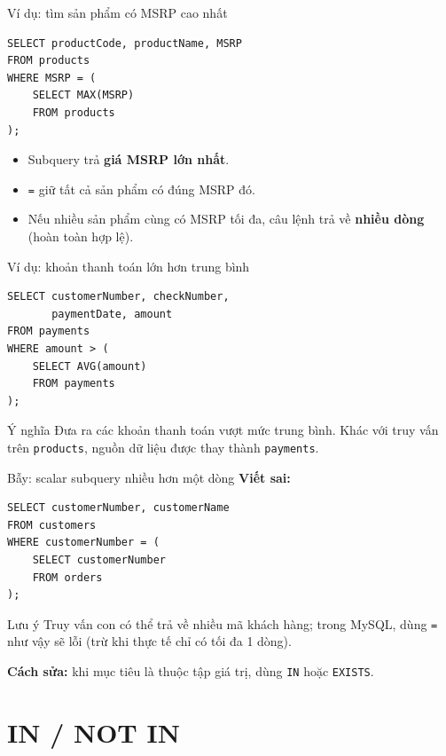 \documentclass[aspectratio=169,10pt]{beamer}
\newcommand{\code}[1]{\texttt{#1}}
\begin{document}
\begin{frame}[fragile]{Ví dụ: tìm sản phẩm có MSRP cao nhất}
\begin{lstlisting}
SELECT productCode, productName, MSRP
FROM products
WHERE MSRP = (
    SELECT MAX(MSRP)
    FROM products
);
\end{lstlisting}
\begin{itemize}
\item Subquery trả \textbf{giá MSRP lớn nhất}.
\item \code{=} giữ tất cả sản phẩm có đúng MSRP đó.
\item Nếu nhiều sản phẩm cùng có MSRP tối đa, câu lệnh trả về \textbf{nhiều dòng} (hoàn toàn hợp lệ).
\end{itemize}
\end{frame}

\begin{frame}[fragile]{Ví dụ: khoản thanh toán lớn hơn trung bình}
\begin{lstlisting}
SELECT customerNumber, checkNumber,
       paymentDate, amount
FROM payments
WHERE amount > (
    SELECT AVG(amount)
    FROM payments
);
\end{lstlisting}
\begin{block}{Ý nghĩa}
Đưa ra các khoản thanh toán vượt mức trung bình. Khác với truy vấn trên \code{products}, nguồn dữ liệu được thay thành \code{payments}.
\end{block}
\end{frame}

\begin{frame}[fragile]{Bẫy: scalar subquery nhiều hơn một dòng}
\textbf{Viết sai:}\begin{lstlisting}
SELECT customerNumber, customerName
FROM customers
WHERE customerNumber = (
    SELECT customerNumber
    FROM orders
);
\end{lstlisting}
\begin{alertblock}{Lưu ý}
\small Truy vấn con có thể trả về nhiều mã khách hàng; trong MySQL, dùng \code{=} như vậy sẽ lỗi (trừ khi thực tế chỉ có tối đa 1 dòng).
\end{alertblock}
\small \textbf{Cách sửa:} khi mục tiêu là thuộc tập giá trị, dùng \code{IN} hoặc \code{EXISTS}.
\end{frame}

\section{IN / NOT IN}
\end{document}
